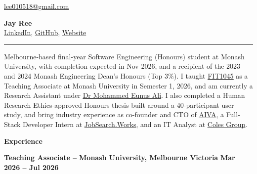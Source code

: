 \documentclass[11pt, a4paper]{article}
\let\hrefnoul\href
\renewcommand{\href}[2]{\hrefnoul{#1}{\ul{#2}}}
\newcommand{\resumesection}[1]{%
  \vspace{6pt}\par
  {\setlength{\fboxsep}{5pt}%
   \noindent\colorbox{sectionbg}{%
     \parbox{\dimexpr\linewidth-10pt\relax}{\strut\textbf{\large #1}\strut}%
   }}%
  \vspace{2pt}\par
}
\begin{document}

\noindent
\begin{minipage}[c]{0.25\textwidth}
  \href{mailto:lee010518@gmail.com}{lee010518@gmail.com}
\end{minipage}%
\begin{minipage}[c]{0.50\textwidth}
  \centering
  {\fontsize{26}{30}\selectfont\textbf{Jay Ree}}\\[3pt]
  \href{https://www.linkedin.com/in/jaeyun-ree-75b17b26b/}{LinkedIn},%
  \href{https://github.com/JayReeMarine/}{GitHub},%
  \href{https://jaeyunree.com/}{Website}%
\end{minipage}%
\begin{minipage}[c]{0.25\textwidth}
\end{minipage}

\vspace{4pt}
{\color{linkblue}\rule{\linewidth}{1.2pt}}
\vspace{2pt}

Melbourne-based final-year Software Engineering (Honours) student at Monash University, with completion expected in Nov 2026, and a recipient of the 2023 and 2024 Monash Engineering Dean's Honours (Top 3\%). I taught \href{https://handbook.monash.edu/2025/units/fit1045}{FIT1045} as a Teaching Associate at Monash University in Semester 1, 2026, and am currently a Research Assistant under \href{https://research.monash.edu/en/persons/eunus-ali}{Dr Mohammed Eunus Ali}. I also completed a Human Research Ethics-approved Honours thesis built around a 40-participant user study, and bring industry experience as co-founder and CTO of \href{https://github.com/AIVA-MVP}{AIVA}, a Full-Stack Developer Intern at \href{https://www.linkedin.com/company/job-search-works/posts/?feedView=all}{JobSearch.Works}, and an IT Analyst at \href{https://www.linkedin.com/company/colesgroup/posts/?feedView=all}{Coles Group}.

\resumesection{Experience}

\noindent\textbf{Teaching Associate –}
\textbf{Monash University, Melbourne Victoria}%
\hfill\textbf{Mar 2026 – Jul 2026}
\end{document}
